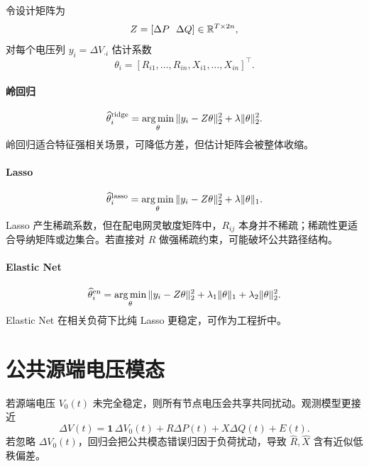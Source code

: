 令设计矩阵为
\begin{equation}
  Z=[\Delta P\ \ \Delta Q]\in\mathbb{R}^{T\times 2n},
\end{equation}
对每个电压列 $y_i=\Delta V_{\cdot i}$ 估计系数
\begin{equation}
  \theta_i=[R_{i1},\ldots,R_{in},X_{i1},\ldots,X_{in}]^\top .
\end{equation}

\paragraph{岭回归}
\begin{equation}
  \widehat\theta_i^{\rm ridge}
  =\operatorname*{arg\,min}_\theta \|y_i-Z\theta\|_2^2+\lambda\|\theta\|_2^2.
\end{equation}
岭回归适合特征强相关场景，可降低方差，但估计矩阵会被整体收缩。

\paragraph{Lasso}
\begin{equation}
  \widehat\theta_i^{\rm lasso}
  =\operatorname*{arg\,min}_\theta \|y_i-Z\theta\|_2^2+\lambda\|\theta\|_1.
\end{equation}
Lasso 产生稀疏系数，但在配电网灵敏度矩阵中，$R_{ij}$ 本身并不稀疏；稀疏性更适合导纳矩阵或边集合。若直接对 $R$ 做强稀疏约束，可能破坏公共路径结构。

\paragraph{Elastic Net}
\begin{equation}
  \widehat\theta_i^{\rm en}
  =\operatorname*{arg\,min}_\theta \|y_i-Z\theta\|_2^2
  +\lambda_1\|\theta\|_1+\lambda_2\|\theta\|_2^2.
\end{equation}
Elastic Net 在相关负荷下比纯 Lasso 更稳定，可作为工程折中。

\section{公共源端电压模态}

若源端电压 $V_0(t)$ 未完全稳定，则所有节点电压会共享共同扰动。观测模型更接近
\begin{equation}
  \Delta V(t)=\mathbf{1}\,\Delta V_0(t)+R\Delta P(t)+X\Delta Q(t)+E(t).
  \label{eq:source_mode}
\end{equation}
若忽略 $\Delta V_0(t)$，回归会把公共模态错误归因于负荷扰动，导致 $\widehat R,\widehat X$ 含有近似低秩偏差。

